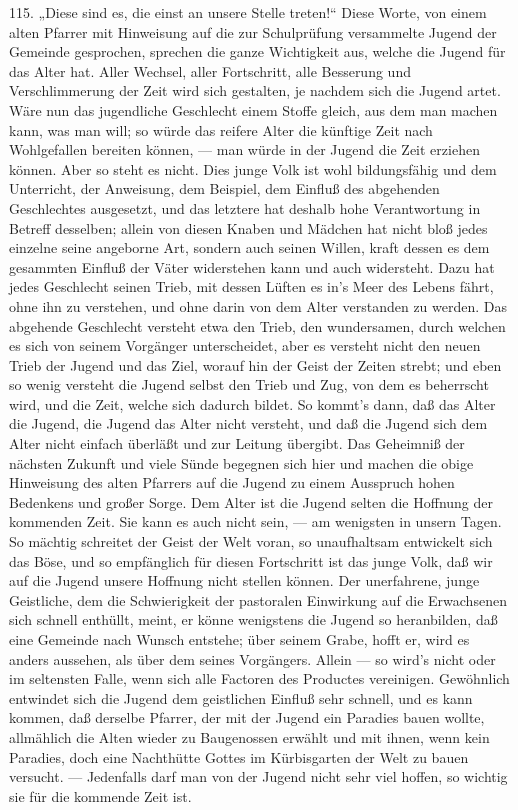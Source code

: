 115. „Diese sind es, die einst an unsere Stelle treten!“ Diese Worte, von einem alten Pfarrer mit Hinweisung auf die zur Schulprüfung versammelte Jugend der Gemeinde gesprochen, sprechen die ganze Wichtigkeit aus, welche die Jugend für das Alter hat. Aller Wechsel, aller Fortschritt, alle Besserung und Verschlimmerung der Zeit wird sich gestalten, je nachdem sich die Jugend artet. Wäre nun das jugendliche Geschlecht einem Stoffe gleich, aus dem man machen kann, was man will; so würde das reifere Alter die künftige Zeit nach Wohlgefallen bereiten können, — man würde in der Jugend die Zeit erziehen können. Aber so steht es nicht. Dies junge Volk ist wohl bildungsfähig und dem Unterricht, der Anweisung, dem Beispiel, dem Einfluß des abgehenden Geschlechtes ausgesetzt, und das letztere hat deshalb hohe Verantwortung in Betreff desselben; allein von diesen Knaben und Mädchen hat nicht bloß jedes einzelne seine angeborne Art, sondern auch seinen Willen, kraft dessen es dem gesammten Einfluß der Väter widerstehen kann und auch widersteht. Dazu hat jedes Geschlecht seinen Trieb, mit dessen Lüften es in’s Meer des Lebens fährt, ohne ihn zu verstehen, und ohne darin von dem Alter verstanden zu werden. Das abgehende Geschlecht versteht etwa den Trieb, den wundersamen, durch welchen es sich von seinem Vorgänger unterscheidet,
aber es versteht nicht den neuen Trieb der Jugend und das Ziel, worauf hin der Geist der Zeiten strebt; und eben so wenig versteht die Jugend selbst den Trieb und Zug, von dem es beherrscht wird, und die Zeit, welche sich dadurch bildet. So kommt’s dann, daß das Alter die Jugend, die Jugend das Alter nicht versteht, und daß die Jugend sich dem Alter nicht einfach überläßt und zur Leitung übergibt. Das Geheimniß der nächsten Zukunft und viele Sünde begegnen sich hier und machen die obige Hinweisung des alten Pfarrers auf die Jugend zu einem Ausspruch hohen Bedenkens und großer Sorge. Dem Alter ist die Jugend selten die Hoffnung der kommenden Zeit. Sie kann es auch nicht sein, — am wenigsten in unsern Tagen. So mächtig schreitet der Geist der Welt voran, so unaufhaltsam entwickelt sich das Böse, und so empfänglich für diesen Fortschritt ist das junge Volk, daß wir auf die Jugend unsere Hoffnung nicht stellen können. Der unerfahrene, junge Geistliche, dem die Schwierigkeit der pastoralen Einwirkung auf die Erwachsenen sich schnell enthüllt, meint, er könne wenigstens die Jugend so heranbilden, daß eine Gemeinde nach Wunsch entstehe; über seinem Grabe, hofft er, wird es anders aussehen, als über dem seines Vorgängers. Allein — so wird’s nicht oder im seltensten Falle, wenn sich alle Factoren des Productes vereinigen. Gewöhnlich entwindet sich die Jugend dem geistlichen Einfluß sehr schnell, und es kann kommen, daß derselbe Pfarrer, der mit der Jugend ein Paradies bauen wollte, allmählich die Alten wieder zu Baugenossen erwählt und mit ihnen, wenn kein Paradies, doch eine
Nachthütte Gottes im Kürbisgarten der Welt zu bauen versucht. — Jedenfalls darf man von der Jugend nicht sehr viel hoffen, so wichtig sie für die kommende Zeit ist.

